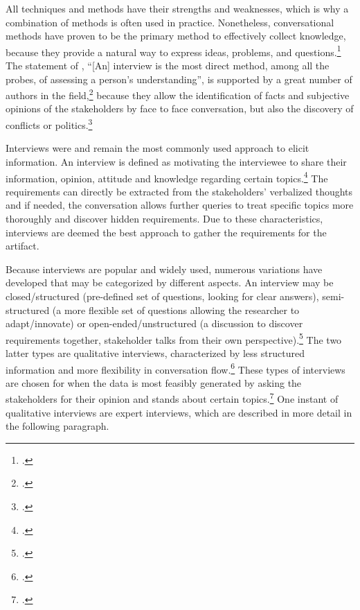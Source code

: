 All techniques and methods have their strengths and weaknesses, which is why a combination of methods is often used in  practice. Nonetheless, conversational methods have proven to be the primary method to effectively collect knowledge, because they provide a natural way to express ideas, problems, and questions.\footcites[Cf.][pp.226/227]{ZhangEffectiverequirementsdevelopmentA2007}[cf.][p.42]{ZowghiRequirementselicitationsurvey2005}
The statement of \cite{WhiteProbingunderstanding1992}, \enquote{[An] interview is the most direct method, among all the probes, of assessing a person’s understanding}, is supported by a great number of authors in the field,\footcites[Cf.][p.174]{MacaulayRequirementscapturecooperative1993}[cf.][p.105]{SommervilleSoftwareengineering2011}[cf.][p.25]{ZowghiRequirementselicitationsurvey2005}[cf.][p.172]{HickeyElicitationtechniqueselection2003}[cf.][p.227]{ZhangEffectiverequirementsdevelopmentA2007}[cf.][p.92]{MasonQualitativeresearching2002} because they allow the identification of facts and subjective opinions of the stakeholders by face to face conversation, but also the discovery of conflicts or politics.\footcites[Cf.][p.2]{TiwariMethodologySelectionRequirement2017}

Interviews were and remain the most commonly used approach to elicit information. An interview is defined as motivating the interviewee to share their information, opinion, attitude and knowledge regarding certain topics.\footcite[Cf.][p.133]{KrugerqualitativeInhaltsanalyseMethode2004} The requirements can directly be extracted from the stakeholders' verbalized thoughts and if needed, the conversation allows further queries to treat specific topics more thoroughly and discover hidden requirements. Due to these characteristics, interviews are deemed the best approach to gather the requirements for the artifact.

Because interviews are popular and widely used, numerous variations have developed that may be categorized by different aspects. An interview may be closed/structured (pre-defined set of questions, looking for clear answers), semi-structured (a more flexible set of questions allowing the researcher to adapt/innovate) or open-ended/unstructured (a discussion to discover requirements together, stakeholder talks from their own perspective).\footcites[Cf.][p.2]{TiwariMethodologySelectionRequirement2017}[cf.][pp.39]{EdwardsWhatqualitativeinterviewing2013} The two latter types are qualitative interviews, characterized by less structured information and more flexibility in conversation flow.\footcite[Cf.][p.13]{EdwardsWhatqualitativeinterviewing2013} These types of interviews are chosen for when the data is most feasibly generated by asking the stakeholders for their opinion and stands about certain topics.\footcite[Cf.][p.76]{MasonQualitativeresearching2002} One instant of qualitative interviews are expert interviews, which are described in more detail in the following paragraph.

